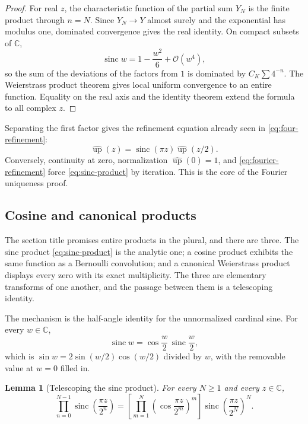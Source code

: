 \documentclass[11pt,oneside]{article}
\newtheorem{lemma}[theorem]{Lemma}
\theoremstyle{definition}
\theoremstyle{remark}
\newcommand{\C}{\mathbb C}
\newcommand{\Up}{\operatorname{up}}
\newcommand{\sinc}{\operatorname{sinc}}
\newcommand{\bigO}{\mathcal O}
\begin{document}
\begin{proof}
For real $z$, the characteristic function of the partial sum $Y_N$ is the finite product
through $n=N$.  Since $Y_N\to Y$ almost surely and the exponential has modulus one,
dominated convergence gives the real identity.  On compact subsets of $\C$,
\begin{equation*}
 \sinc w=1-\frac{w^2}{6}+\bigO(w^4),
\end{equation*}
so the sum of the deviations of the factors from $1$ is dominated by
$C_K\sum4^{-n}$.  The Weierstrass product theorem gives local uniform convergence to an
entire function.  Equality on the real axis and the identity theorem extend the formula to
all complex $z$.
\end{proof}

Separating the first factor gives the refinement equation already seen in
\eqref{eq:four-refinement}:
\begin{equation}
 \widehat{\Up}(z)=\sinc(\pi z)\widehat{\Up}(z/2).          \label{eq:fourier-refinement}
\end{equation}
Conversely, continuity at zero, normalization $\widehat{\Up}(0)=1$, and
\eqref{eq:fourier-refinement} force \eqref{eq:sinc-product} by iteration.  This is the core
of the Fourier uniqueness proof.


\subsection{Cosine and canonical products}

The section title promises entire products in the plural, and there are three.  The sinc
product \eqref{eq:sinc-product} is the analytic one; a cosine product exhibits the same
function as a Bernoulli convolution; and a canonical Weierstrass product displays every zero
with its exact multiplicity.  The three are elementary transforms of one another, and the
passage between them is a telescoping identity.

The mechanism is the half-angle identity for the unnormalized cardinal sine.  For every
$w\in\C$,
\begin{equation}
 \sinc w=\cos\frac w2\,\sinc\frac w2,                      \label{eq:four-half-angle}
\end{equation}
which is $\sin w=2\sin(w/2)\cos(w/2)$ divided by $w$, with the removable value at $w=0$
filled in.

\begin{lemma}[Telescoping the sinc product]
\label{lem:four-telescope}
For every $N\ge1$ and every $z\in\C$,
\begin{equation}
 \prod_{n=0}^{N-1}\sinc\!\left(\frac{\pi z}{2^n}\right)
 =\left[\prod_{m=1}^{N}
   \left(\cos\frac{\pi z}{2^m}\right)^{m}\right]
   \sinc\!\left(\frac{\pi z}{2^N}\right)^{N}.              \label{eq:four-telescope}
\end{equation}
\end{lemma}
\end{document}
